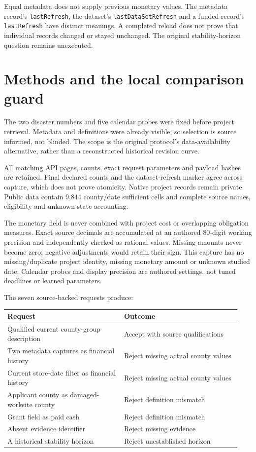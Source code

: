 \documentclass[11pt,letterpaper]{article}
\newcommand{\SufficientCells}{9,844}
\begin{document}
Equal metadata does not supply previous monetary values. The metadata record's \texttt{lastRefresh}, the dataset's \texttt{lastDataSetRefresh} and a funded record's \texttt{lastRefresh} have distinct meanings. A completed reload does not prove that individual records changed or stayed unchanged. The original stability-horizon question remains unexecuted.
\newpage

\section*{Methods and the local comparison guard}
The two disaster numbers and five calendar probes were fixed before project retrieval. Metadata and definitions were already visible, so selection is source informed, not blinded. The scope is the original protocol's data-availability alternative, rather than a reconstructed historical revision curve.

All matching API pages, counts, exact request parameters and payload hashes are retained. Final declared counts and the dataset-refresh marker agree across capture, which does not prove atomicity. Native project records remain private. Public data contain \SufficientCells{} county/date sufficient cells and complete source names, eligibility and unknown-state accounting.

The monetary field is never combined with project cost or overlapping obligation measures. Exact source decimals are accumulated at an authored 80-digit working precision and independently checked as rational values. Missing amounts never become zero; negative adjustments would retain their sign. This capture has no missing/duplicate project identity, missing monetary amount or unknown studied date. Calendar probes and display precision are authored settings, not tuned deadlines or learned parameters.

The seven source-backed requests produce:

\small
\begin{tabular}{@{}p{0.47\linewidth}p{0.47\linewidth}@{}}
\toprule
Request & Outcome\\
\midrule
Qualified current county-group description & Accept with source qualifications\\
Two metadata captures as financial history & Reject missing actual county values\\
Current store-date filter as financial history & Reject missing actual county values\\
Applicant county as damaged-worksite county & Reject definition mismatch\\
Grant field as paid cash & Reject definition mismatch\\
Absent evidence identifier & Reject missing evidence\\
A historical stability horizon & Reject unestablished horizon\\
\bottomrule
\end{tabular}
\normalsize
\end{document}
